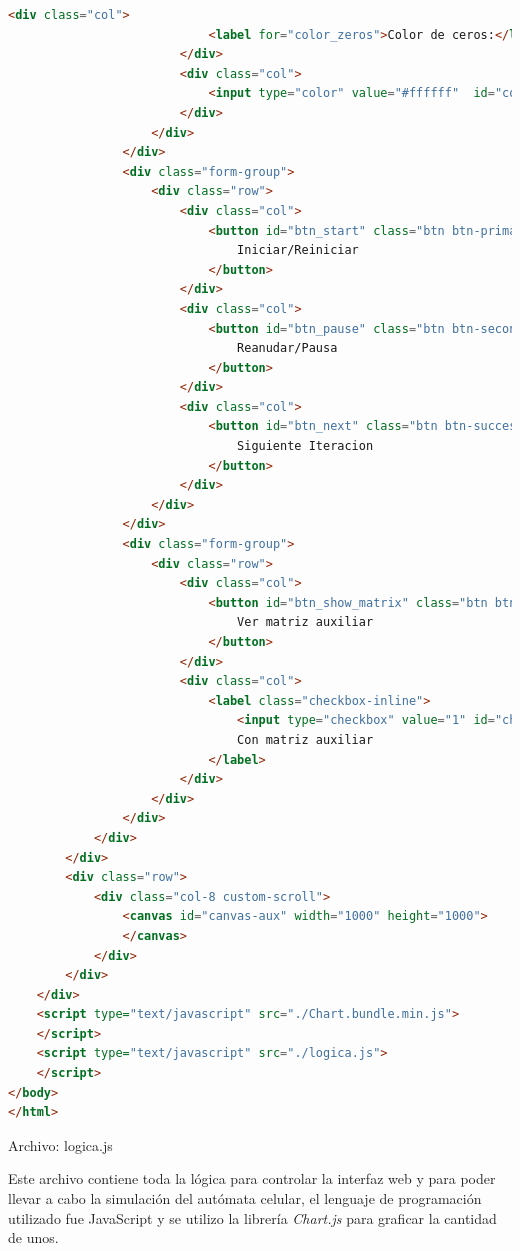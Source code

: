 \documentclass[12pt, titlepage]{article}
\begin{document}
\begin{lstlisting}[language=html]
                        <div class="col">
                            <label for="color_zeros">Color de ceros:</label>
                        </div>
                        <div class="col">
                            <input type="color" value="#ffffff"  id="color_zeros">
                        </div>
                    </div>
                </div>
                <div class="form-group">
                    <div class="row">
                        <div class="col">
                            <button id="btn_start" class="btn btn-primary btn-sm">
                                Iniciar/Reiniciar
                            </button>
                        </div>
                        <div class="col">
                            <button id="btn_pause" class="btn btn-secondary btn-sm">
                                Reanudar/Pausa
                            </button>
                        </div>
                        <div class="col">
                            <button id="btn_next" class="btn btn-success btn-sm">
                                Siguiente Iteracion
                            </button>
                        </div>
                    </div>
                </div>
                <div class="form-group">
                    <div class="row">
                        <div class="col">
                            <button id="btn_show_matrix" class="btn btn-warning btn-sm">
                                Ver matriz auxiliar
                            </button>
                        </div>
                        <div class="col">
                            <label class="checkbox-inline">
                                <input type="checkbox" value="1" id="check-matrix">
                                Con matriz auxiliar
                            </label>
                        </div>
                    </div>
                </div>
            </div>
        </div>
        <div class="row">
            <div class="col-8 custom-scroll">
                <canvas id="canvas-aux" width="1000" height="1000">
                </canvas>
            </div>
        </div>
    </div>
    <script type="text/javascript" src="./Chart.bundle.min.js">
    </script>
    <script type="text/javascript" src="./logica.js">
    </script>
</body>
</html>
\end{lstlisting}

Archivo: logica.js

Este archivo contiene toda la lógica para controlar la interfaz web y para poder llevar a cabo la simulación del autómata celular, el lenguaje de programación utilizado fue JavaScript y se utilizo la librería \emph{Chart.js} para graficar la cantidad de unos.
\end{document}

